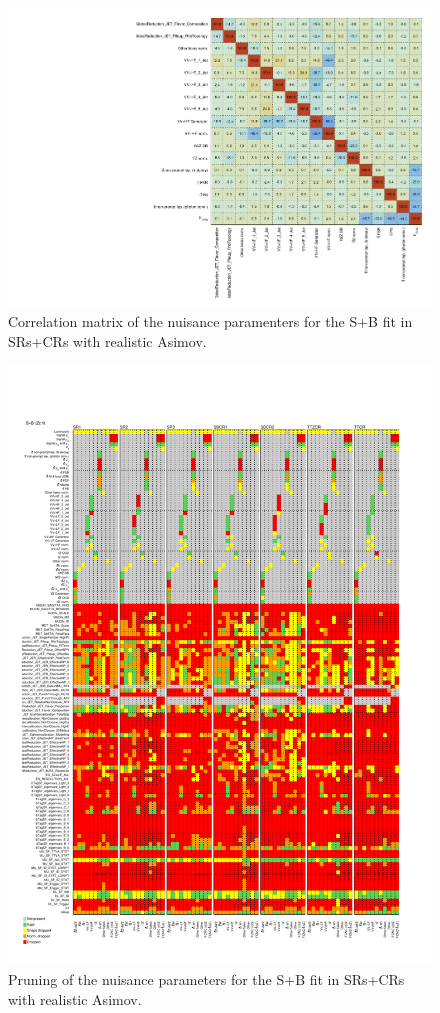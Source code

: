 \begin{figure}[htbp]
	\centering
	\includegraphics[width=.95\textwidth]{Chapters/CH8/figures/SPLUSB_CRSR_UsingDL1rcFullSys/CorrMatrix}
	\caption{Correlation matrix of the nuisance paramenters for the S+B \tZc fit in SRs+CRs with realistic Asimov.}%
	\label{fig:stat:tzc:splusb:crsr:corrmatrix}
\end{figure}

\begin{figure}[htbp]
	\centering
	\includegraphics[width=.85\textwidth]{Chapters/CH8/figures/SPLUSB_CRSR_UsingDL1rcFullSys/Pruning}
	\caption{Pruning of the nuisance parameters for the S+B \tZc fit in SRs+CRs with realistic Asimov.}%
	\label{fig:stat:tzc:splusb:crsr:pruning}
\end{figure}


